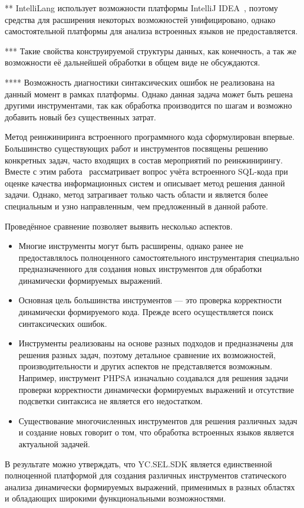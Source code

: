 \begin{table} [htbp]
\begin{threeparttable}
{\begin{tablenotes}
            \item[**] IntelliLang использует возможности платформы IntelliJ IDEA~\cite{IDEA}, поэтому средства для расширения некоторых возможностей унифицировано, однако самостоятельной платформы для анализа встроенных языков не предоставляется.
            \item[***] Такие свойства конструируемой структуры данных, как конечность, а так же возможности её дальнейшей обработки в общем виде не обсуждаются.
            \item[****] Возможность диагностики синтаксических ошибок не реализована на данный момент в рамках платформы. Однако данная задача может быть решена другими инструментами, так как обработка производится по шагам и возможно добавить новый без существенных затрат.
  \end{tablenotes}    }
  \end{threeparttable}
\end{table}

Метод реинжиниринга встроенного программного кода сформулирован впервые. Большинство существующих работ и инструментов посвящены решению конкретных задач, часто входящих в состав мероприятий по реинжинирингу. 
Вместе с этим работа~\cite{DSQLQualityMesure} рассматривает вопрос учёта встроенного SQL-кода при оценке качества информационных систем и описывает метод решения данной задачи. Однако, метод
затрагивает только часть области и является более специальным и узно направленным, чем предложенный в данной работе. 

Проведённое сравнение позволяет выявить несколько аспектов.
\begin{itemize}
    \item Многие инструменты могут быть расширены, однако ранее не предоставлялось полноценного самостоятельного инструментария специально предназначенного для создания новых инструментов для обработки динамически формируемых выражений.
    \item Основная цель большинства инструментов --- это проверка корректности динамически формируемого кода. Прежде всего осуществляется поиск синтаксических ошибок.
    \item Инструменты реализованы на основе разных подходов и предназначены для решения разных задач, поэтому детальное сравнение их возможностей, производительности и других аспектов не представляется возможным. Например, инструмент PHPSA изначально создавался для решения задачи проверки корректности динамически формируемых выражений и отсутствие подсветки синтаксиса не является его недостатком.
    \item Существование многочисленных инструментов для решения различных задач и создание новых говорит о том, что обработка встроенных языков является актуальной задачей.
\end{itemize}

В результате можно утверждать, что YC.SEL.SDK является единственной полноценной платформой для создания различных инструментов статического анализа динамически формируемых выражений, применимых в разных областях и обладающих широкими функциональными возможностями.


